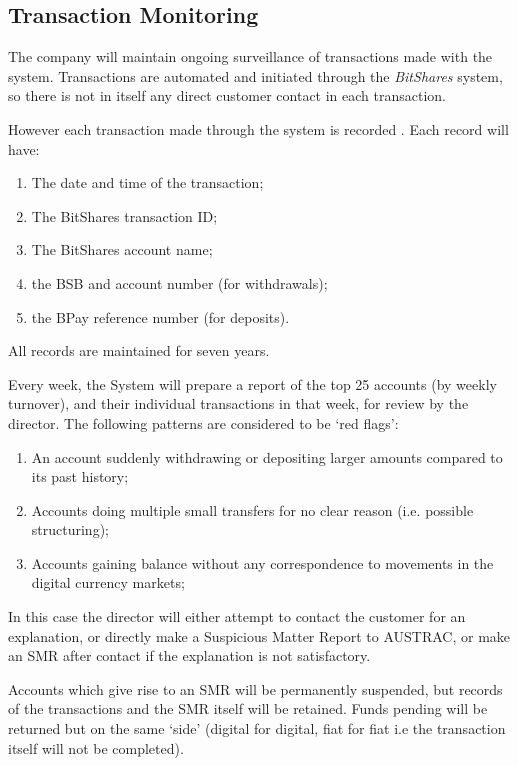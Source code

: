 \documentclass[12pt]{report}
\begin{document}
\subsection{Transaction Monitoring}

The company will maintain ongoing surveillance of transactions made with the system. Transactions are automated
and initiated through the \emph{BitShares} system, so there is not in itself any direct customer contact
in each transaction.

However each transaction made through the system is recorded . Each record will have:
\begin{enumerate}
  \item The date and time of the transaction;
  \item The BitShares transaction ID;
  \item The BitShares account name;
  \item the BSB and account number (for withdrawals);
  \item the BPay reference number (for deposits).
\end{enumerate}

All records are maintained for seven years.

Every week, the System will prepare a report of the top 25 accounts (by weekly turnover), and their individual transactions in that week,
for review by the director. The following patterns are considered to be `red flags':
\begin{enumerate}
\item An account suddenly withdrawing or depositing larger amounts compared to its past history;
\item Accounts doing multiple small transfers for no clear reason (i.e. possible structuring);
\item Accounts gaining balance without any correspondence to movements in the digital currency markets;
\end{enumerate}

In this case the director will either attempt to contact the customer for an explanation, or directly make a Suspicious Matter Report to AUSTRAC,
or make an SMR after contact if the explanation is not satisfactory.

Accounts which give rise to an SMR will be permanently suspended, but records of the transactions and the SMR itself will be retained. Funds
pending will be returned but on the same `side' (digital for digital, fiat for fiat i.e the transaction itself will not be completed).
\end{document}
